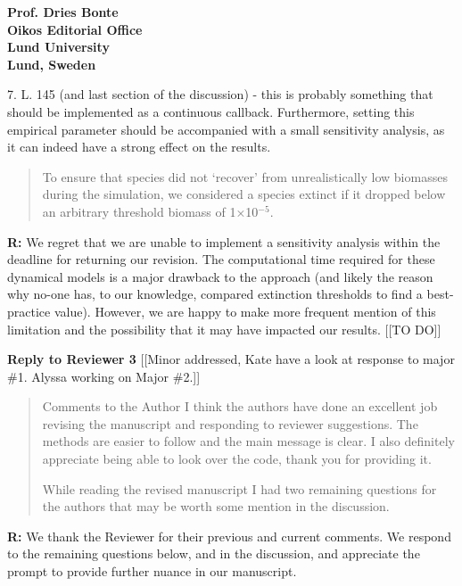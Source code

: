 \documentclass[12pt]{letter}
\begin{document}
\begin{letter}{\bf Prof. Dries Bonte\\
Oikos Editorial Office \\
Lund University \\
Lund, Sweden}
    \smallskip

    7. L. 145 (and last section of the discussion) - this is probably something that should be implemented as a continuous callback. Furthermore, setting this empirical parameter should be accompanied with a small sensitivity analysis, as it can indeed have a strong effect on the results.

    \smallskip

    \begin{quotation}
    To ensure that species did not ‘recover’ from unrealistically low biomasses during the simulation, we considered a species extinct if it dropped below an arbitrary threshold biomass of 1×10$^{−5}$.
    \end{quotation}

    \textbf{R:} We regret that we are unable to implement a sensitivity analysis within the deadline for returning our revision. The computational time required for these dynamical models is a major drawback to the approach (and likely the reason why no-one has, to our knowledge, compared extinction thresholds to find a best-practice value). However, we are happy to make more frequent mention of this limitation and the possibility that it may have impacted our results. [[TO DO]]

\clearpage


{\large \textbf{Reply to Reviewer 3}} [[Minor addressed, Kate have a look at response to major \#1. Alyssa working on Major \#2.]]

  \begin{quotation}
    Comments to the Author
    I think the authors have done an excellent job revising the manuscript and responding to reviewer suggestions. The methods are easier to follow and the main message is clear. I also definitely appreciate being able to look over the code, thank you for providing it.   

    While reading the revised manuscript I had two remaining questions for the authors that may be worth some mention in the discussion. 

  \end{quotation}

  \smallskip

  \textbf{R:} We thank the Reviewer for their previous and current comments. We respond to the remaining questions below, and in the discussion, and appreciate the prompt to provide further nuance in our manuscript.

  \smallskip


\end{letter}
\end{document}
